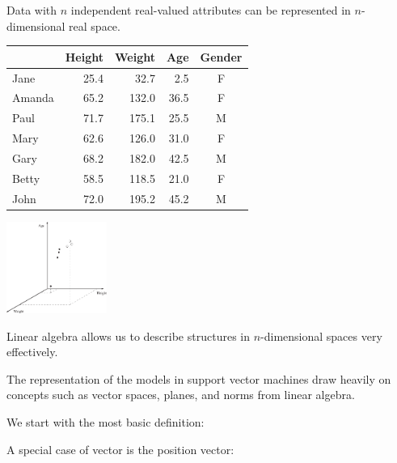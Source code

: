 \documentclass[a4paper,blends,pdf,colorBG,slideColor]{prosper}
\begin{document}
Data with $n$ independent real-valued attributes can be represented in $n$-dimensional real space.

\begin{center}
{\tiny
   \begin{tabular}{ l rrr c}
      \toprule
         & Height  & Weight & Age & Gender\\
      \midrule
      Jane      & 25.4 & 32.7 & 2.5 & F \\
      Amanda & 65.2 & 132.0 & 36.5 & F \\
      Paul      & 71.7 & 175.1 & 25.5 & M \\
      Mary      & 62.6 & 126.0 & 31.0 & F \\
      Gary      & 68.2 & 182.0 & 42.5 & M \\
     Betty      & 58.5 & 118.5 & 21.0 & F \\
     John  & 72.0 & 195.2 & 45.2 & M\\
      \bottomrule
   \end{tabular}
}
\end{center}

\includegraphics[height=30mm]{figures/fig03-01.eps}

\es

Linear algebra allows us to describe structures in $n$-dimensional spaces
very effectively.

The representation of the models in support vector machines draw heavily on
concepts such as vector spaces, planes, and norms from linear algebra.

We start with the most basic definition:


A special case of vector is the position vector:

\end{document}
